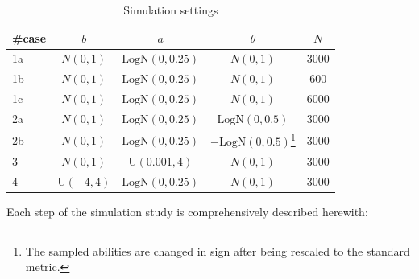 \begin{table}[H]
	\centering
	\caption{Simulation settings \label{tab:casesJulia}}
	\begin{tabular}{ l c c c c  }
		\toprule
		\#case     & $b$ & $a$ & $\theta$ & $N$ \\%
		\midrule
		\color{DarkCyan}1a    & $N(0,1)$ & $\text{LogN}(0,0.25)$& $N(0,1)$ & $3000$ \\%
		\color{black}1b   & $N(0,1)$ & $\text{LogN}(0,0.25)$ & $N(0,1)$  & $600$ \\%
		1c    & $N(0,1)$ & $\text{LogN}(0,0.25)$ & $N(0,1)$ &  $6000$ \\%
		2a    & $N(0,1)$ & $\text{LogN}(0,0.25)$ & $\text{LogN}(0,0.5)$& $3000$\\%
		2b    & $N(0,1)$ & $\text{LogN}(0,0.25)$ & $-\text{LogN}(0,0.5)$\footnote{The sampled abilities are changed in sign after being rescaled to the standard metric.}& $3000$\\%
		3    & $N(0,1)$ & $\text{U}(0.001,4)$ & $N(0,1)$  & $3000$\\%
		4    & $\text{U}(-4,4)$ &  $\text{LogN}(0,0.25)$& $N(0,1)$  & $3000$\\%
		\bottomrule    
	\end{tabular}
\end{table}
Each step of the simulation study is comprehensively described herewith:
